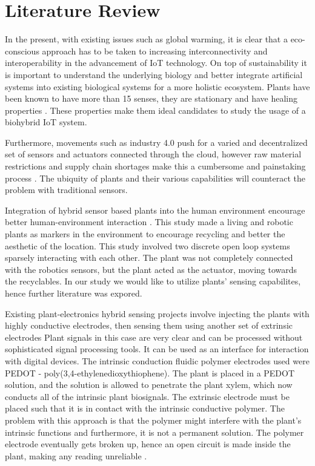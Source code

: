 \documentclass[conference]{IEEEtran}
\begin{document}
\section{Literature Review}

In the present, with existing issues such as global warming, it is clear
that a eco-conscious approach has to be taken to increasing interconnectivity
and interoperability in the advancement of IoT technology. On top of 
sustainability it is important to understand the underlying biology and 
better integrate artificial systems into existing biological systems for a more holistic
ecosystem. Plants have been known to have more than 15 senses, they are
stationary and have healing properties \cite{zotero-44}. These properties
make them ideal candidates to study the usage of a biohybrid IoT system.
 
Furthermore, movements such as industry 4.0 push for a varied and
decentralized set of sensors and actuators connected through the
cloud, however raw material restrictions and supply chain shortages
make this a cumbersome and painstaking process \cite{dadashpour2022}. 
The ubiquity of plants and their various capabilities will counteract
the problem with traditional sensors.

Integration of hybrid sensor based plants into the human environment encourage
better human-environment interaction \cite{holstius2004}. This study made a
living and robotic plants as markers in the environment to encourage recycling
and better the aesthetic of the location. This study involved two discrete 
open loop systems sparsely interacting with each other. The plant was not completely
connected with the robotics sensors, but the plant acted as the actuator, moving towards
the recyclables. In our study we would like to utilize plants' sensing capabilites,
hence further literature was expored.

Existing plant-electronics hybrid sensing projects involve injecting the 
plants with highly conductive electrodes, then sensing them using
another set of extrinsic electrodes 
Plant signals in this case are very clear and can be processed without
sophisticated signal processing tools. It can be used as an interface for
interaction with digital devices. The intrinsic conduction fluidic
polymer electrodes used were PEDOT - poly(3,4-ethylenedioxythiophene).
The plant is placed in a PEDOT solution, and the solution is allowed to 
penetrate the plant xylem, which now conducts all of the intrinsic plant
biosignals. The extrinsic electrode must be placed such that it is in 
contact with the intrinsic conductive polymer. The problem with this 
approach is that the polymer might interfere with the plant’s intrinsic
functions and furthermore, it is not a permanent solution. The polymer 
electrode eventually gets broken up, hence an open circuit is made inside
the plant, making any reading unreliable \cite{sareen2019}. 
\end{document}
